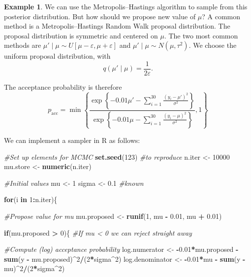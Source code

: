 \documentclass[
]{book}
\newenvironment{Shaded}{\begin{snugshade}}{\end{snugshade}}
\newcommand{\CommentTok}[1]{\textcolor[rgb]{0.56,0.35,0.01}{\textit{#1}}}
\newcommand{\ControlFlowTok}[1]{\textcolor[rgb]{0.13,0.29,0.53}{\textbf{#1}}}
\newcommand{\DecValTok}[1]{\textcolor[rgb]{0.00,0.00,0.81}{#1}}
\newcommand{\FloatTok}[1]{\textcolor[rgb]{0.00,0.00,0.81}{#1}}
\newcommand{\FunctionTok}[1]{\textcolor[rgb]{0.13,0.29,0.53}{\textbf{#1}}}
\newcommand{\NormalTok}[1]{#1}
\newcommand{\OtherTok}[1]{\textcolor[rgb]{0.56,0.35,0.01}{#1}}
\newcommand{\SpecialCharTok}[1]{\textcolor[rgb]{0.81,0.36,0.00}{\textbf{#1}}}
\theoremstyle{definition}
\theoremstyle{definition}
\newtheorem{example}{Example}[chapter]
\theoremstyle{definition}
\theoremstyle{definition}
\theoremstyle{remark}
\begin{document}
\begin{example}
We can use the Metropolis--Hastings algorithm to sample from this posterior distribution. But how should we propose new value of \(\mu\)? A common method is a Metropolis--Hastings Random Walk proposal distribution. The proposal distribution is symmetric and centered on \(\mu\). The two most common methods are \(\mu' \mid \mu \sim U[\mu - \varepsilon, \mu + \varepsilon]\) and \(\mu' \mid \mu \sim N(\mu, \tau^2)\). We choose the uniform proposal distribution, with
\[
q(\mu' \mid \mu) = \frac{1}{2\varepsilon}.
\]

The acceptance probability is therefore
\[
p_\textrm{acc} = \min\left\{\frac{\exp\left\{-0.01\mu' -\sum_{i=1}^{30}\frac{(y_i - \mu')^2}{\sigma^2}\right\} }{\exp\left\{-0.01\mu -\sum_{i=1}^{30}\frac{(y_i - \mu)^2}{\sigma^2}\right\} }, 1\right\}
\]

We can implement a sampler in R as follows:

\begin{Shaded}
\begin{Highlighting}[]
\CommentTok{\#Set up elements for MCMC}
\FunctionTok{set.seed}\NormalTok{(}\DecValTok{123}\NormalTok{) }\CommentTok{\#to reproduce}
\NormalTok{n.iter   }\OtherTok{\textless{}{-}} \DecValTok{10000}
\NormalTok{mu.store }\OtherTok{\textless{}{-}} \FunctionTok{numeric}\NormalTok{(n.iter)}

\CommentTok{\#Initial values}
\NormalTok{mu }\OtherTok{\textless{}{-}} \DecValTok{1} 
\NormalTok{sigma }\OtherTok{\textless{}{-}} \FloatTok{0.1} \CommentTok{\#known}

\ControlFlowTok{for}\NormalTok{(i }\ControlFlowTok{in} \DecValTok{1}\SpecialCharTok{:}\NormalTok{n.iter)\{}
  
  \CommentTok{\#Propose value for mu}
\NormalTok{  mu.proposed }\OtherTok{\textless{}{-}} \FunctionTok{runif}\NormalTok{(}\DecValTok{1}\NormalTok{, mu }\SpecialCharTok{{-}} \FloatTok{0.01}\NormalTok{, mu }\SpecialCharTok{+} \FloatTok{0.01}\NormalTok{)}
  
  \ControlFlowTok{if}\NormalTok{(mu.proposed }\SpecialCharTok{\textgreater{}} \DecValTok{0}\NormalTok{)\{ }\CommentTok{\#If mu \textless{} 0 we can reject straight away}
    
    \CommentTok{\#Compute (log) acceptance probability}
\NormalTok{    log.numerator   }\OtherTok{\textless{}{-}} \SpecialCharTok{{-}}\FloatTok{0.01}\SpecialCharTok{*}\NormalTok{mu.proposed }\SpecialCharTok{{-}} 
                      \FunctionTok{sum}\NormalTok{(y }\SpecialCharTok{{-}}\NormalTok{ mu.proposed)}\SpecialCharTok{\^{}}\DecValTok{2}\SpecialCharTok{/}\NormalTok{(}\DecValTok{2}\SpecialCharTok{*}\NormalTok{sigma}\SpecialCharTok{\^{}}\DecValTok{2}\NormalTok{)}
\NormalTok{    log.denominator }\OtherTok{\textless{}{-}} \SpecialCharTok{{-}}\FloatTok{0.01}\SpecialCharTok{*}\NormalTok{mu }\SpecialCharTok{{-}} \FunctionTok{sum}\NormalTok{(y }\SpecialCharTok{{-}}\NormalTok{ mu)}\SpecialCharTok{\^{}}\DecValTok{2}\SpecialCharTok{/}\NormalTok{(}\DecValTok{2}\SpecialCharTok{*}\NormalTok{sigma}\SpecialCharTok{\^{}}\DecValTok{2}\NormalTok{)}
    

\end{Highlighting}
\end{Shaded}
\end{example}
\end{document}
